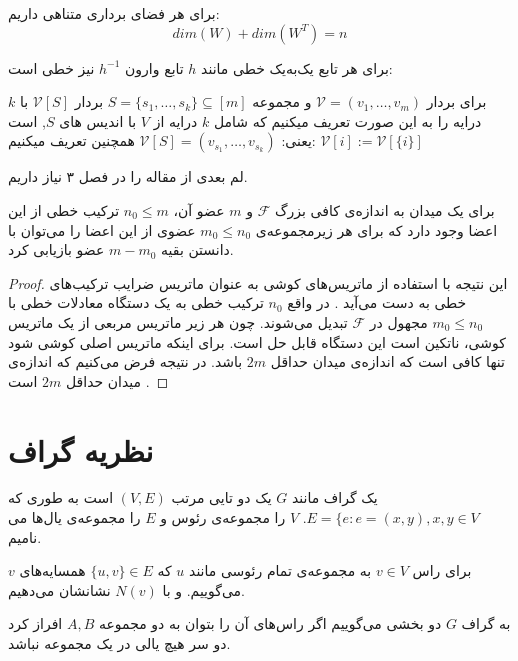 \begin{theorem}
	برای هر فضای برداری متناهی داریم:
	$$dim(W) + dim(W^T) = n$$
\end{theorem}
\begin{remark}
	برای هر تابع یک‌به‌یک خطی مانند
	$h$
	تابع وارون 
	$h^{-1}$
	نیز خطی است:
\end{remark}

برای بردار
$\mathcal{V} = (v_1, \ldots, v_m)$ 
و مجموعه
$S = \{s_1, \ldots, s_k\} \subseteq [m]$
بردار
$\mathcal{V} [S]$ 
با 
$k$
درایه را به این صورت تعریف میکنیم که شامل 
$k$ 
درایه از
$V$ 
با اندیس های
$S$, 
است یعنی:
$\mathcal{V} [S] = (v_{s_1}, \ldots, v_{s_k})$
همچنین تعریف میکنیم:
$\mathcal{V} [i] := \mathcal{V} [{\{i\}}]$

لم بعدی از مقاله
\cite{pliable2015paper}
را در فصل ۳ نیاز داریم.
\begin{lemma}
	برای یک میدان به اندازه‌ی کافی بزرگ
	$\mathcal{F}$
	و
	$m$
	عضو آن،
	$n_0 \leq m$
	ترکیب خطی از این اعضا وجود دارد که برای هر زیرمجموعه‌ی
	$m_0 \leq n_0$
	عضوی از این اعضا را می‌توان با دانستن بقیه
	$m - m_0$
	عضو بازیابی کرد.
\end{lemma}
\begin{proof}
این نتیجه با استفاده از ماتریس‌های کوشی به عنوان ماتریس ضرایب ترکیب‌های خطی به دست می‌آید
\cite{Blmer1995AnXE}
. در واقع
$n_0$
ترکیب خطی به یک دستگاه معادلات خطی با
$m_0 \leq n_0$
مجهول در
$\mathcal{F}$
تبدیل می‌شوند. چون هر زیر ماتریس مربعی از یک ماتریس کوشی، ناتکین است این دستگاه قابل حل است. برای اینکه ماتریس اصلی کوشی شود تنها کافی است که اندازه‌ی میدان حداقل
$2m$
باشد. در نتیجه فرض می‌کنیم که اندازه‌ی میدان حداقل
$2m$
است
\cite{pliable2015paper}.
\end{proof}

\section{نظریه گراف}
\begin{definition}
یک گراف مانند
$G$
یک دو تایی مرتب
$(V, E)$
است به طوری که
$E = \{e: e = (x, y), x, y \in V$.
 $V$
را مجموعه‌ی رئوس و
$E$
را مجموعه‌ی یال‌ها می نامیم.

برای راس
$v\in V$
به مجمو‌عه‌ی تمام رئوسی مانند
  $u$ 
  که
  $\{u,v\}\in E$ 
  همسایه‌های 
  $v$
  می‌گوییم.
  و با
  $N(v)$
  نشانشان می‌دهیم.
  
به گراف
$G$
دو بخشی می‌گوییم اگر راس‌های آن را بتوان به دو مجموعه 
$A, B$
افراز کرد دو سر هیچ یالی در یک مجموعه نباشد.
\end{definition}

